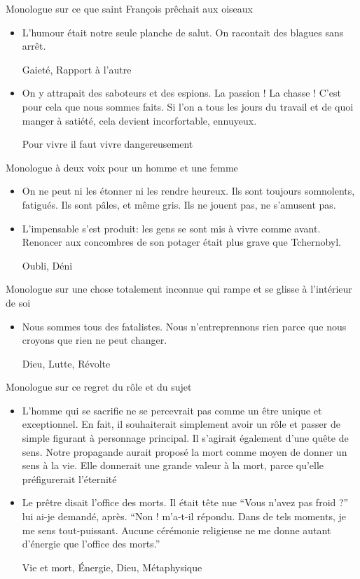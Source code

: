 \documentclass[french,a4paper,11pt,answers]{exam}
\newcommand{\cit}[2]{\og #1 \fg{} \begin{solution}{ #2 }\end{solution}} %
\begin{document}
	\begin{cadre}{Monologue sur ce que saint François prêchait aux oiseaux}
		\begin{itemize}
			\item \cit{L'humour était notre seule planche de salut. On racontait des blagues sans arrêt.}
				{Gaieté, Rapport à l'autre}
			\item \cit {On y attrapait des saboteurs et des espions. La passion ! La chasse ! C'est pour cela que nous sommes faits. Si l'on a tous les jours du travail et de quoi manger à satiété, cela devient incorfortable, ennuyeux.}
				{Pour vivre il faut vivre dangereusement}
		\end{itemize}
	\end{cadre}
	
	\begin{cadre}{Monologue à deux voix pour un homme et une femme}
		\begin{itemize}
			\item \cit{On ne peut ni les étonner ni les rendre heureux. Ils sont toujours somnolents, fatigués. Ils sont pâles, et même gris. Ils ne jouent pas, ne s'amusent pas.}
				{}
			\item \cit{L'impensable s'est produit: les gens se sont mis à vivre comme avant. Renoncer aux concombres de son potager était plus grave que Tchernobyl.}
				{Oubli, Déni}
		\end{itemize}
	\end{cadre}
	
	\begin{cadre}{Monologue sur une chose totalement inconnue qui rampe et se glisse à l'intérieur de soi}
		\begin{itemize}
			\item \cit{Nous sommes tous des fatalistes. Nous n'entreprennons rien parce que nous croyons que rien ne peut changer.}
				{Dieu, Lutte, Révolte}
		\end{itemize}
	\end{cadre}
	
	\begin{cadre}{Monologue sur ce regret du rôle et du sujet}
		\begin{itemize}
			\item \cit{L'homme qui se sacrifie ne se percevrait pas comme un être unique et exceptionnel. En fait, il souhaiterait simplement avoir un rôle et passer de simple figurant à personnage principal. Il s'agirait également d'une quête de sens. Notre propagande aurait proposé la mort comme moyen de donner un sens à la vie. Elle donnerait une grande valeur à la mort, parce qu'elle préfigurerait l'éternité}
				{}
			\item \cit{Le prêtre disait l'office des morts. Il était tête nue  “Vous n'avez pas froid ?'' lui ai-je demandé, après.  “Non ! m'a-t-il répondu. Dans de tels moments, je me sens tout-puissant. Aucune cérémonie religieuse ne me donne autant d'énergie que l'office des morts.''}
				{Vie et mort, Énergie, Dieu, Métaphysique}
		\end{itemize}
	\end{cadre}
	
\end{document}
